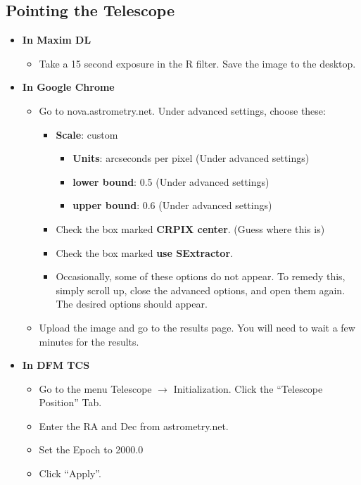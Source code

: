 \documentclass[letterpaper, 12pt]{report}
\begin{document}
\subsection{Pointing the Telescope}
\begin{itemize}
	\item \large \textbf{In Maxim DL}
	\begin{itemize}
		\item Take a 15 second exposure in the R filter. Save the image to the desktop.
	\end{itemize}
	\item \large \textbf{In Google Chrome}
	\begin{itemize}
		\item Go to nova.astrometry.net. Under advanced settings, choose these:
		\begin{itemize}
			\item \textbf{Scale}: custom
			\begin{itemize}
				\item \textbf{Units}: arcseconds per pixel (Under advanced settings)
				\item \textbf{lower bound}: 0.5 (Under advanced settings)
				\item \textbf{upper bound}: 0.6 (Under advanced settings)
			\end{itemize}
			\item Check the box marked \textbf{CRPIX center}. (Guess where this is)
			\item Check the box marked \textbf{use SExtractor}.
			\item Occasionally, some of these options do not appear. To remedy this, simply scroll up, close the advanced options, and open them again. The desired options should appear.
		\end{itemize}
		\item Upload the image and go to the results page. You will need to wait a few minutes for the results.
	\end{itemize}
	\newpage
	\item \large \textbf{In DFM TCS}
	\begin{itemize}
		\item Go to the menu Telescope $\rightarrow$ Initialization. Click the ``Telescope Position'' Tab.
		\item Enter the RA and Dec from astrometry.net.
		\item Set the Epoch to 2000.0
		\item Click ``Apply''.
	\end{itemize}
\end{itemize}
\end{document}
